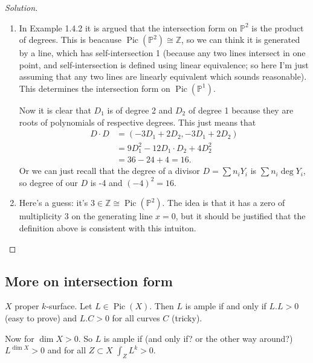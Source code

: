 \begin{proof}[Solution]\leavevmode
\begin{enumerate}[label=(\alph*)]
\item In Example 1.4.2 it is argued that the intersection form on $\mathbb{P}^2$ is the product of degrees. This is beacause $\operatorname{Pic}(\mathbb{P}^2) \cong\mathbb{Z}$, so we can think it is generated by a line, which has self-intersection 1 (because any two lines intersect in one point, and self-intersection is defined using linear equivalence; so here I'm just assuming that any two lines are linearly equivalent which sounds reasonable). This determines the intersection form on $\operatorname{Pic}(\mathbb{P}^1)$.

	Now it is clear that $D_1$ is of degree 2 and $D_2$ of degree 1 because they are roots of polynomials of respective degrees. This just means that
\begin{align*}
	D\cdot D&=(-3D_1+2D_2,-3D_1+2D_2)\\
	&=9D_1^2-12D_1\cdot D_2+4D_2^2\\
	&=36-24+4=16.
\end{align*}
Or we can just recall that the degree of a divisor $D=\sum n_iY_i$ is $\sum n_{i}\operatorname{deg}Y_i$, so degree of our  $D$ is -4 and $(-4)^2=16$.
\item Here's a guess: it's $3 \in\mathbb{Z}\cong \operatorname{Pic}(\mathbb{P}^2)$. The idea is that it has a zero of multiplicity 3 on the generating line $x=0$, but it should be justified that the definition above is consistent with this intuiton.
\end{enumerate}
\end{proof}

\subsection{More on intersection form}

\begin{thm}\leavevmode
	$X$ proper $k$-surface. Let $L \in \operatorname{Pic}(X)$. Then $L $ is ample if and only if $L.L>0$ (easy to prove) and $L.C>0$ for all curves $C$  (tricky).
\end{thm}

\begin{thm}\leavevmode
	Now for $\dim X>0$. So $L$ is ample if (and only if? or the other way around?) $L^{\dim X}>0$ and  for all $Z\subset X$ $\int_{Z}L^k>0$.
\end{thm}

